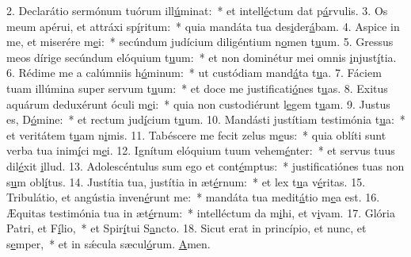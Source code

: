 2. Declarátio sermónum tuórum ill\uline{ú}minat:~* et intell\uline{é}ctum dat p\uline{á}rvulis.
3. Os meum apérui, et attráxi sp\uline{í}ritum:~* quia mandáta tua des\uline{i}der\uline{á}bam.
4. Aspice in me, et miserére m\uline{e}i:~* secúndum judícium diligéntium n\uline{o}men t\uline{u}um.
5. Gressus meos dírige secúndum elóquium t\uline{u}um:~* et non dominétur mei omnis \uline{i}njust\uline{í}tia.
6. Rédime me a calúmniis h\uline{ó}minum:~* ut custódiam mand\uline{á}ta t\uline{u}a.
7. Fáciem tuam illúmina super servum t\uline{u}um:~* et doce me justificati\uline{ó}nes t\uline{u}as.
8. Exitus aquárum deduxérunt óculi m\uline{e}i:~* quia non custodiérunt l\uline{e}gem t\uline{u}am.
9. Justus es, D\uline{ó}mine:~* et rectum jud\uline{í}cium t\uline{u}um.
10. Mandásti justítiam testimónia t\uline{u}a:~* et veritátem t\uline{u}am n\uline{i}mis.
11. Tabéscere me fecit zelus m\uline{e}us:~* quia oblíti sunt verba tua inim\uline{í}ci m\uline{e}i.
12. Ignítum elóquium tuum vehem\uline{é}nter:~* et servus tuus dil\uline{é}xit \uline{i}llud.
13. Adolescéntulus sum ego et cont\uline{é}mptus:~* justificatiónes tuas non s\uline{u}m obl\uline{í}tus.
14. Justítia tua, justítia in æt\uline{é}rnum:~* et lex t\uline{u}a v\uline{é}ritas.
15. Tribulátio, et angústia inven\uline{é}runt me:~* mandáta tua medit\uline{á}tio m\uline{e}a est.
16. Æquitas testimónia tua in æt\uline{é}rnum:~* intelléctum da m\uline{i}hi, et v\uline{i}vam.
17. Glória Patri, et F\uline{í}lio,~* et Spir\uline{í}tui S\uline{a}ncto.
18. Sicut erat in princípio, et nunc, et s\uline{e}mper,~* et in sǽcula sæcul\uline{ó}rum. \uline{A}men.
